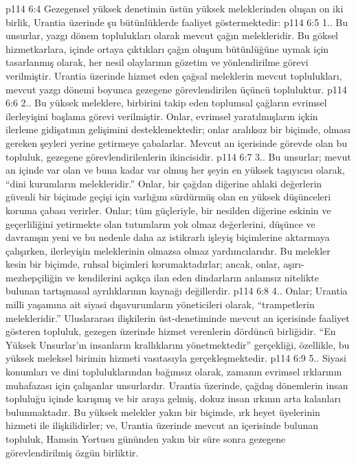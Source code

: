 \vs p114 6:4 Gezegensel yüksek denetimin üstün yüksek meleklerinden oluşan on iki birlik, Urantia üzerinde şu bütünlüklerde faaliyet göstermektedir:
\vs p114 6:5 1.\bibnobreakspace {}. Bu unsurlar, yazgı dönem toplulukları olarak mevcut çağın melekleridir. Bu göksel hizmetkarlara, içinde ortaya çıktıkları çağın oluşum bütünlüğüne uymak için tasarlanmış olarak, her nesil olaylarının gözetim ve yönlendirilme görevi verilmiştir. Urantia üzerinde hizmet eden çağsal meleklerin mevcut toplulukları, mevcut yazgı dönemi boyunca gezegene görevlendirilen üçüncü topluluktur.
\vs p114 6:6 2.. Bu yüksek meleklere, birbirini takip eden toplumsal çağların evrimsel ilerleyişini başlama görevi verilmiştir. Onlar, evrimsel yaratılmışların içkin ilerleme gidişatının gelişimini desteklemektedir; onlar aralıksız bir biçimde, olması gereken şeyleri yerine getirmeye çabalarlar. Mevcut an içerisinde görevde olan bu topluluk, gezegene görevlendirilenlerin ikincisidir.
\vs p114 6:7 3.\bibnobreakspace {}. Bu unsurlar; mevut an içinde var olan ve buna kadar var olmuş her şeyin en yüksek taşıyıcısı olarak, “dini kurumların melekleridir.” Onlar, bir çağdan diğerine ahlaki değerlerin güvenli bir biçimde geçişi için varlığını sürdürmüş olan en yüksek düşünceleri koruma çabası verirler. Onlar; tüm güçleriyle, bir nesilden diğerine eskinin ve geçerliliğini yetirmekte olan tutumların yok olmaz değerlerini, düşünce ve davranışın yeni ve bu nedenle daha az istikrarlı işleyiş biçimlerine aktarmaya çalışırken, ilerleyişin meleklerinin olmazsa olmaz yardımcılarıdır. Bu melekler kesin bir biçimde, ruhsal biçimleri korumaktadırlar; ancak, onlar, aşırı\hyp{}mezhepçiliğin ve kendilerini açıkça ilan eden dindarların anlamsız nitelikte bulunan tartışmasal ayrılıklarının kaynağı değillerdir.
\vs p114 6:8 4.\bibnobreakspace {}. Onlar; Urantia milli yaşamına ait siyasi dışavurumların yöneticileri olarak, “trampetlerin melekleridir.” Uluslararası ilişkilerin üst\hyp{}denetiminde mevcut an içerisinde faaliyet gösteren topluluk, gezegen üzerinde hizmet verenlerin dördüncü birliğidir. “En Yüksek Unsurlar’ın insanların krallıklarını yönetmektedir” gerçekliği, özellikle, bu yüksek meleksel birimin hizmeti vasıtasıyla gerçekleşmektedir.
\vs p114 6:9 5.\bibnobreakspace {}. Siyasi konumları ve dini topluluklarından bağımsız olarak, zamanın evrimsel ırklarının muhafazası için çalışanlar unsurlardır. Urantia üzerinde, çağdaş dönemlerin insan topluluğu içinde karışmış ve bir araya gelmiş, dokuz insan ırkının arta kalanları bulunmaktadır. Bu yüksek melekler yakın bir biçimde, ırk heyet üyelerinin hizmeti ile ilişkilidirler; ve, Urantia üzerinde mevcut an içerisinde bulunan topluluk, Hamsin Yortusu gününden yakın bir süre sonra gezegene görevlendirilmiş özgün birliktir.
